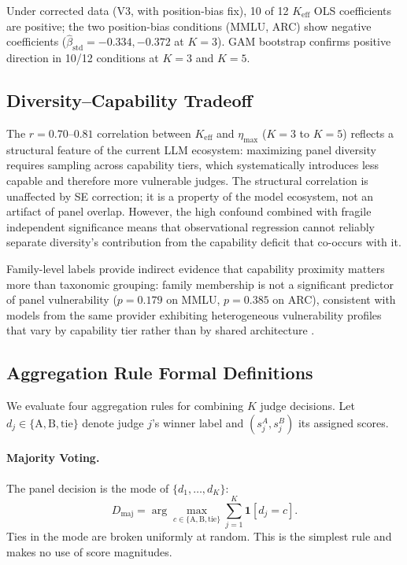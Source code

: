 Under corrected data (V3, with position-bias fix), 10 of 12 $K_{\mathrm{eff}}$ OLS coefficients are positive; the two position-bias conditions (MMLU, ARC) show negative coefficients ($\hat{\beta}_{\mathrm{std}} = -0.334, -0.372$ at $K{=}3$). GAM bootstrap confirms positive direction in 10/12 conditions at $K{=}3$ and $K{=}5$.

\subsection{Diversity--Capability Tradeoff}
\label{app:diversity_capability}

The $r = 0.70$--$0.81$ correlation between $K_{\mathrm{eff}}$ and $\eta_{\max}$ ($K{=}3$ to $K{=}5$) reflects a structural feature of the current LLM ecosystem: maximizing panel diversity requires sampling across capability tiers, which systematically introduces less capable and therefore more vulnerable judges. The structural correlation is unaffected by SE correction; it is a property of the model ecosystem, not an artifact of panel overlap. However, the high confound combined with fragile independent significance means that observational regression cannot reliably separate diversity's contribution from the capability deficit that co-occurs with it.


Family-level labels provide indirect evidence that capability proximity matters more than taxonomic grouping: family membership is not a significant predictor of panel vulnerability ($p = 0.179$ on MMLU, $p = 0.385$ on ARC), consistent with models from the same provider exhibiting heterogeneous vulnerability profiles that vary by capability tier rather than by shared architecture \citep{kuncheva2003measures}.

\subsection{Aggregation Rule Formal Definitions}
\label{app:aggregation_formal}

We evaluate four aggregation rules for combining $K$ judge decisions. Let $d_j \in \{\text{A}, \text{B}, \text{tie}\}$ denote judge $j$'s winner label and $(s_j^A, s_j^B)$ its assigned scores.

\paragraph{Majority Voting.} The panel decision is the mode of $\{d_1, \ldots, d_K\}$:
\begin{equation}
D_{\mathrm{maj}} = \arg\max_{c \in \{\text{A},\text{B},\text{tie}\}} \sum_{j=1}^{K} \mathbf{1}[d_j = c].
\end{equation}
Ties in the mode are broken uniformly at random. This is the simplest rule and makes no use of score magnitudes.

